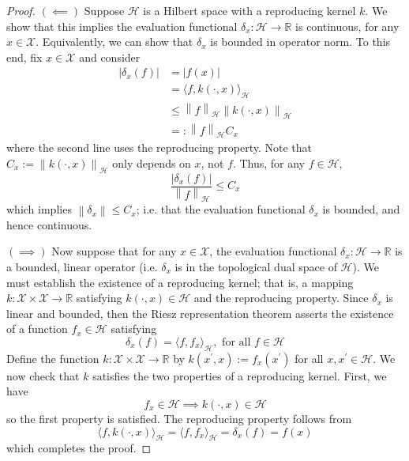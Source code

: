 \documentclass[12pt]{article}
\newcommand*{\norm}[1]{\left\lVert#1\right\rVert}
\newcommand*{\abs}[1]{\left\lvert#1\right\rvert}
\newcommand{\R}{\mathbb{R}}
\begin{document}
 \begin{proof} 
 $(\impliedby)$ Suppose $\mathcal{H}$ is a Hilbert space with a reproducing kernel $k$. We show that this implies the evaluation functional $\delta_x: \mathcal{H} \to \R$ is continuous, for any 
 $x \in \mathcal{X}$. Equivalently, we can show that $\delta_x$ is bounded in operator norm. To this end, fix $x \in \mathcal{X}$ and consider
 \begin{align*}
 \abs{\delta_x(f)} &= \abs{f(x)} \\
 			  &= \langle f, k(\cdot, x) \rangle_{\mathcal{H}} \\
			  &\leq \norm{f}_{\mathcal{H}} \norm{k(\cdot, x)}_{\mathcal{H}} \\
			  &=: \norm{f}_{\mathcal{H}} C_x
 \end{align*}
 where the second line uses the reproducing property. Note that $C_x := \norm{k(\cdot, x)}_{\mathcal{H}}$ only depends on $x$, not $f$. Thus, for any $f \in \mathcal{H}$, 
 \[\frac{ \abs{\delta_x(f)}}{\norm{f}_{\mathcal{H}}} \leq C_x\]
 which implies $\norm{\delta_x} \leq C_x$; i.e. that the evaluation functional $\delta_x$ is bounded, and hence continuous.
 
 $(\implies)$ Now suppose that for any $x \in \mathcal{X}$, the evaluation functional $\delta_x: \mathcal{H} \to \R$ is a bounded, linear operator (i.e. $\delta_x$ is in the topological dual space 
 of $\mathcal{H}$). We must establish the existence of a reproducing kernel; that is, a mapping $k: \mathcal{X} \times \mathcal{X} \to \R$ satisfying $k(\cdot, x) \in \mathcal{H}$ and the 
 reproducing property. Since $\delta_x$ is linear and bounded, then the Riesz representation theorem asserts the existence of a function $f_x \in \mathcal{H}$ satisfying 
 \[\delta_x(f) = \langle f, f_x \rangle_{\mathcal{H}}, \text{ for all } f \in \mathcal{H}\]
 Define the function $k: \mathcal{X} \times \mathcal{X} \to \R$ by $k(x^\prime, x) := f_x(x^\prime)$ for all $x, x^\prime \in \mathcal{H}$. We now check that $k$ satisfies the two properties of a 
 reproducing kernel. First, we have
 \[f_x \in \mathcal{H} \implies k(\cdot, x) \in \mathcal{H}\]
 so the first property is satisfied. The reproducing property follows from 
 \[\langle f, k(\cdot, x)\rangle_{\mathcal{H}} = \langle f, f_x \rangle_{\mathcal{H}} = \delta_x(f) = f(x)\]
 which completes the proof. 
\end{proof}
 
\end{document}
